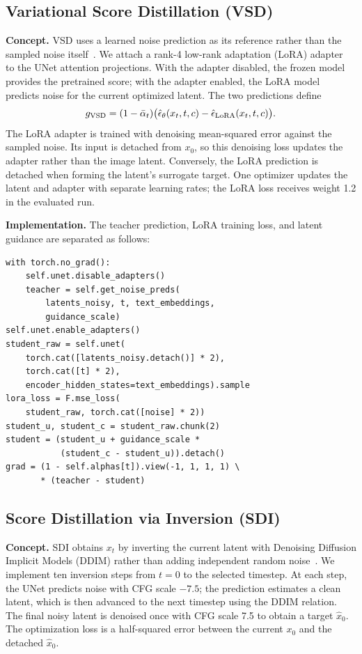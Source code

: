 \subsection{Variational Score Distillation (VSD)}
\label{sec:vsd}

\noindent\textbf{Concept.} VSD uses a learned noise prediction as its reference rather than the sampled noise itself~\cite{wang2023prolificdreamer}. We attach a rank-4 low-rank adaptation (LoRA) adapter~\cite{hu2022lora} to the UNet attention projections. With the adapter disabled, the frozen model provides the pretrained score; with the adapter enabled, the LoRA model predicts noise for the current optimized latent. The two predictions define
\begin{equation}
g_{\rm VSD}=(1-\bar\alpha_t)
  \bigl(\hat\epsilon_\theta(x_t,t,c)
        -\hat\epsilon_{\rm LoRA}(x_t,t,c)\bigr).
\end{equation}
The LoRA adapter is trained with denoising mean-squared error against the sampled noise. Its input is detached from $x_0$, so this denoising loss updates the adapter rather than the image latent. Conversely, the LoRA prediction is detached when forming the latent's surrogate target. One optimizer updates the latent and adapter with separate learning rates; the LoRA loss receives weight 1.2 in the evaluated run.

\noindent\textbf{Implementation.} The teacher prediction, LoRA training loss, and latent guidance are separated as follows:
\begin{lstlisting}
with torch.no_grad():
    self.unet.disable_adapters()
    teacher = self.get_noise_preds(
        latents_noisy, t, text_embeddings,
        guidance_scale)
self.unet.enable_adapters()
student_raw = self.unet(
    torch.cat([latents_noisy.detach()] * 2),
    torch.cat([t] * 2),
    encoder_hidden_states=text_embeddings).sample
lora_loss = F.mse_loss(
    student_raw, torch.cat([noise] * 2))
student_u, student_c = student_raw.chunk(2)
student = (student_u + guidance_scale *
           (student_c - student_u)).detach()
grad = (1 - self.alphas[t]).view(-1, 1, 1, 1) \
       * (teacher - student)
\end{lstlisting}

\subsection{Score Distillation via Inversion (SDI)}
\label{sec:sdi}

\noindent\textbf{Concept.} SDI obtains $x_t$ by inverting the current latent with Denoising Diffusion Implicit Models (DDIM) rather than adding independent random noise~\cite{lukoianov2024sdi,song2021ddim}. We implement ten inversion steps from $t=0$ to the selected timestep. At each step, the UNet predicts noise with CFG scale $-7.5$; the prediction estimates a clean latent, which is then advanced to the next timestep using the DDIM relation. The final noisy latent is denoised once with CFG scale 7.5 to obtain a target $\hat x_0$. The optimization loss is a half-squared error between the current $x_0$ and the detached $\hat x_0$.

